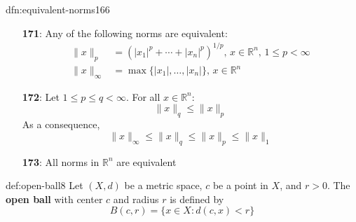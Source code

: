 \documentclass[landscape, 8pt]{extarticle}
\begin{document}
\begin{multicols}{3}
\begin{dfn}{dfn:equivalent-norms}{166}

    \vspace{-10pt}
    \begin{itemize}
        \item[\textbf{171}:] Any of the following norms are equivalent:
            \begin{align*}
                \lVert x \rVert_{p} &= (\lvert x_{1} \rvert^{p} + \cdots + \lvert x_{n} \rvert^{p})^{1 /p},\,x\in \mathbb{R}^{n},\, 1\le p < \infty\\
                \lVert x \rVert_{\infty} &= \max \{\lvert x_{1} \rvert,\dots,\lvert x_{n} \rvert\},\,x\in\mathbb{R}^{n}
            \end{align*}
        \item[\textbf{172}:] Let $1 \le p \le q < \infty$. For all $x\in\mathbb{R}^{n}$:
            \[\lVert x \rVert_{q} \le \lVert x \rVert_{p}\]
            As a consequence,
            \[\lVert x \rVert_{\infty} \le \lVert x \rVert_{q} \le \lVert x \rVert_{p} \le \lVert x \rVert_{1}\]
        \item[\textbf{173}:] All norms in $\mathbb{R}^{n}$ are equivalent

    \end{itemize}
\end{dfn}

\setcounter{subsection}{1}

\begin{dfn}{def:open-ball}{8}
    Let $(X, d)$ be a metric space, $c$ be a point in $X$, and $r > 0$. The \textbf{open ball} with center $c$ and radius $r$ is defined by
    \[B(c,r) = \{x\in X: d(c,x) < r\}\]
\end{dfn}


%
%
%
%


\end{multicols}
\end{document}
